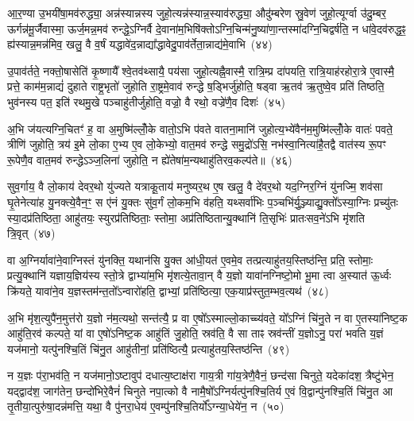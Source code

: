 आ॒र॒ण्या उ॒भयी॑षा॒मव॑रुद्ध्या॒ अन्न॑स्यान्नस्य जुहो॒त्यन्न॑स्यान्न॒स्याव॑रुद्ध्या॒ औदु॑म्बरेण स्रु॒वेण॑ जुहो॒त्यूर्ग्वा उ॑दु॒म्बर॒ ऊर्गन्न॑मू॒र्जैवास्मा॒ ऊर्ज॒मन्न॒मव॑ रुन्द्धे॒\-ऽग्निर्वै दे॒वाना॑म॒भिषि॑क्तो\-ऽग्नि॒चिन्म॑नु॒ष्या॑णा॒न्तस्मा॑दग्नि॒चिद्वर्\mbox{}ष॑ति॒ न धा॑वे॒दव॑रुद्ध॒ꣴ॒ ह्य॑स्यान्न॒मन्न॑मिव॒ खलु॒ वै व॒र्\mbox{}षं यद्धावे॑द॒न्नाद्या᳚द्धावेदु॒पाव॑र्तेता॒न्नाद्य॑मे॒वाभि~(४४)

उ॒पाव॑र्तते॒ नक्तो॒षासेति॑ कृ॒ष्णायै᳚ श्वे॒तव॑थ्सायै॒ पय॑सा जुहो॒त्यह्नै॒वास्मै॒ रात्रि॒म्प्र दा॑पयति॒ रात्रि॒याह॑रहोरा॒त्रे ए॒वास्मै॒ प्रत्ते॒ काम॑म॒न्नाद्यं॑ दुहाते राष्ट्र॒भृतो॑ जुहोति रा॒ष्ट्रमे॒वाव॑ रुन्द्धे ष॒ड्भिर्जु॑होति॒ षड्वा ऋ॒तव॑ ऋ॒तुष्वे॒व प्रति॑ तिष्ठति॒ भुव॑नस्य पत॒ इति॑ रथमु॒खे पञ्चाहु॑तीर्जुहोति॒ वज्रो॒ वै रथो॒ वज्रे॑णै॒व दिशः॑~(४५)

अ॒भि ज॑यत्यग्नि॒चितꣳ॑ ह॒ वा अ॒मुष्मि॑ल्लोँ॒के वातो॒\-ऽभि प॑वते वातना॒मानि॑ जुहोत्य॒भ्ये॑वैन॑म॒मुष्मि॑ल्लोँ॒के वातः॑ पवते॒ त्रीणि॑ जुहोति॒ त्रय॑ इ॒मे लो॒का ए॒भ्य ए॒व लो॒केभ्यो॒ वात॒मव॑ रुन्द्धे समु॒द्रो॑\-ऽसि॒ नभ॑स्वा॒नित्या॑है॒तद्वै वात॑स्य रू॒पꣳ रू॒पेणै॒व वात॒मव॑ रुन्द्धे\-ऽञ्ज॒लिना॑ जुहोति॒ न ह्ये॑तेषा॑म॒न्यथाहु॑तिरव॒कल्प॑ते॥~(४६)

{\anuvakamend[{ओष॑धयः स॒प्ताभि दिशो॒\-ऽन्यथा॒ द्वे च॑}]}%

सुव॒र्गाय॒ वै लो॒काय॑ देवर॒थो यु॑ज्यते यत्राकू॒ताय॑ मनुष्यर॒थ ए॒ष खलु॒ वै दे॑वर॒थो यद॒ग्निर॒ग्निं यु॑नज्मि॒ शव॑सा घृ॒तेनेत्या॑ह यु॒नक्त्ये॒वैन॒ꣳ॒ स ए॑नं यु॒क्तः सु॑व॒र्गं लो॒कम॒भि व॑हति॒ यथ्सर्वा॑भिः प॒ञ्चभि॑र्यु॒ञ्ज्याद्यु॒क्तो᳚\-ऽस्या॒ग्निः प्रच्यु॑तः स्या॒दप्र॑तिष्ठिता॒ आहु॑तयः॒ स्युरप्र॑तिष्ठिताः॒ स्तोमा॒ अप्र॑तिष्ठितान्यु॒क्थानि॑ ति॒सृभिः॑ प्रातःसव॒ने॑\-ऽभि मृ॑शति त्रि॒वृत्~(४७)

वा अ॒ग्निर्यावा॑ने॒वाग्निस्तं यु॑नक्ति॒ यथान॑सि यु॒क्त आ॑धी॒यत॑ ए॒वमे॒व तत्प्रत्याहु॑तय॒स्तिष्ठ॑न्ति॒ प्रति॒ स्तोमाः॒ प्रत्यु॒क्थानि॑ यज्ञाय॒ज्ञिय॑स्य स्तो॒त्रे द्वाभ्या॑म॒भि मृ॑शत्ये॒तावा॒न् वै य॒ज्ञो यावा॑नग्निष्टो॒मो भू॒मा त्वा अ॒स्यात॑ ऊ॒र्ध्वः क्रि॑यते॒ यावा॑ने॒व य॒ज्ञस्तम॑न्त॒तो᳚\-ऽन्वारो॑हति॒ द्वाभ्यां॒ प्रति॑ष्ठित्या॒ एक॒याप्र॑स्तुत॒म्भव॒त्यथ॑~(४८)

अ॒भि मृ॑श॒त्युपै॑न॒मुत्त॑रो य॒ज्ञो न॑म॒त्यथो॒ सन्त॑त्यै॒ प्र वा ए॒षो᳚\-ऽस्माल्लो॒काच्च्य॑वते॒ यो᳚\-ऽग्निं चि॑नु॒ते न वा ए॒तस्या॑निष्ट॒क आहु॑ति॒रव॑ कल्पते॒ यां वा ए॒षो॑\-ऽनिष्ट॒क आहु॑तिं जु॒होति॒ स्रव॑ति॒ वै सा ताꣴ स्रव॑न्तीं य॒ज्ञो\-ऽनु॒ परा॑ भवति य॒ज्ञं यज॑मानो॒ यत्पु॑नश्चि॒तिं चि॑नु॒त आहु॑तीनां॒ प्रति॑ष्ठित्यै॒ प्रत्याहु॑तय॒स्तिष्ठ॑न्ति~(४९)

न य॒ज्ञः प॑रा॒भव॑ति॒ न यज॑मानो॒\-ऽष्टावुप॑ दधात्य॒ष्टाक्ष॑रा गाय॒त्री गा॑य॒त्रेणै॒वैनं॒ छन्द॑सा चिनुते॒ यदेका॑\-दश॒ त्रैष्टु॑भेन॒ यद्द्वाद॑श॒ जाग॑तेन॒ छन्दो॑भिरे॒वैनं॑ चिनुते नपा॒त्को वै नामै॒षो᳚\-ऽग्निर्यत्पु॑नश्चि॒तिर्य ए॒वं वि॒द्वान्पु॑नश्चि॒तिं चि॑नु॒त आ तृ॒तीया॒त्पुरु॑षा॒दन्न॑मत्ति॒ यथा॒ वै पु॑नरा॒धेय॑ ए॒वम्पु॑नश्चि॒तिर्यो᳚\-ऽग्न्या॒धेये॑न॒ न~(५०)

